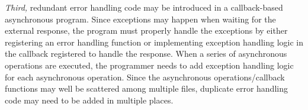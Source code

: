 \textit{Third,} redundant error handling code may be introduced in a callback-based asynchronous program. Since exceptions may happen when waiting for the external response, the program must properly handle the exceptions by either registering an error handling function or implementing exception handling logic in the callback registered to handle the response. When a series of asynchronous operations are executed, the programmer needs to add exception handling logic for each asynchronous operation. %
 Since the asynchronous operations/callback functions may well be scattered among multiple files, duplicate error handling code may need to be added in multiple places.




